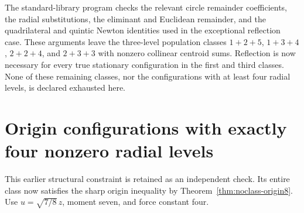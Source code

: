 \documentclass[11pt]{article}
\theoremstyle{remark}
\numberwithin{equation}{section}
\begin{document}
The standard-library program 
checks the relevant circle remainder coefficients, the radial
substitutions, the eliminant and Euclidean remainder, and the
quadrilateral and quintic Newton identities used in the exceptional reflection
case. These arguments leave the three-level population classes
$1+2+5$, $1+3+4$, $2+2+4$, and $2+3+3$ with nonzero collinear
centroid sums. Reflection is now necessary for every true stationary
configuration in the first and third classes. None of these remaining
classes, nor the configurations with at least four radial levels,
is declared exhausted here.

\section{Origin configurations with exactly four nonzero radial levels}
\label{sec:n8-oct7-origin-fourlevels}

This earlier structural constraint is retained as an independent
check. Its entire class now satisfies the sharp origin inequality
by Theorem~\ref{thm:noclass-origin8}. Use $u=\sqrt{7/8}\,z$, moment seven, and force constant four.
\end{document}
